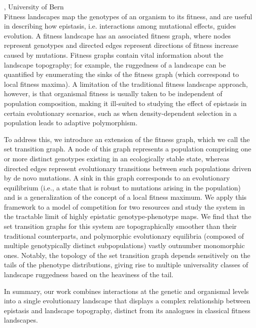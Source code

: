 \documentclass[12pt,a4paper]{article}
\begin{document}
\bigskip\bigskip

, University of Bern \\[2ex] Fitness landscapes map the genotypes of an organism to its fitness, and are useful in describing how epistasis, i.e. interactions among mutational effects, guides evolution. A fitness landscape has an associated fitness graph, where nodes represent genotypes and directed edges represent directions of fitness increase caused by mutations. Fitness graphs contain vital information about the landscape topography; for example, the ruggedness of a landscape can be quantified by enumerating the sinks of the fitness graph (which correspond to local fitness maxima). A limitation of the traditional fitness landscape approach, however, is that organismal fitness is usually taken to be independent of population composition, making it ill-suited to studying the effect of epistasis in certain evolutionary scenarios, such as when density-dependent selection in a population leads to adaptive polymorphism.  

 To address this, we introduce an extension of the fitness graph, which we call the set transition graph. A node of this graph represents a population comprising one or more distinct genotypes existing in an ecologically stable state, whereas directed edges represent evolutionary transitions between such populations driven by de novo mutations. A sink in this graph corresponds to an evolutionary equilibrium (i.e., a state that is robust to mutations arising in the population) and is a generalization of the concept of a local fitness maximum. We apply this framework to a model of competition for two resources and study the system in the tractable limit of highly epistatic genotype-phenotype maps. We find that the set transition graphs for this system are topographically smoother than their traditional counterparts, and polymorphic evolutionary equilibria (composed of multiple genotypically distinct subpopulations) vastly outnumber monomorphic ones. Notably, the topology of the set transition graph depends sensitively on the tails of the phenotype distributions, giving rise to multiple universality classes of landscape ruggedness based on the heaviness of the tail. 

 In summary, our work combines interactions at the genetic and organismal levels into a single evolutionary landscape that displays a complex relationship between epistasis and landscape topography, distinct from its analogues in classical fitness landscapes.  
\end{document}

